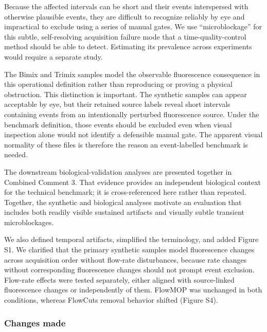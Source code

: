 \documentclass[
  11pt,
  a4paper,
]{article}
\begin{document}
Because the affected intervals can be short and their events
interspersed with otherwise plausible events, they are difficult to
recognize reliably by eye and impractical to exclude using a series of
manual gates. We use ``microblockage'' for this subtle, self-resolving
acquisition failure mode that a time-quality-control method should be
able to detect. Estimating its prevalence across experiments would
require a separate study.

The Bimix and Trimix samples model the observable fluorescence
consequence in this operational definition rather than reproducing or
proving a physical obstruction. This distinction is important. The
synthetic samples can appear acceptable by eye, but their retained
source labels reveal short intervals containing events from an
intentionally perturbed fluorescence source. Under the benchmark
definition, those events should be excluded even when visual inspection
alone would not identify a defensible manual gate. The apparent visual
normality of these files is therefore the reason an event-labelled
benchmark is needed.

The downstream biological-validation analyses are presented together in
Combined Comment 3. That evidence provides an independent biological
context for the technical benchmark; it is cross-referenced here rather
than repeated. Together, the synthetic and biological analyses motivate
an evaluation that includes both readily visible sustained artifacts and
visually subtle transient microblockages.

We also defined temporal artifacts, simplified the terminology, and
added Figure S1. We clarified that the primary synthetic samples model
fluorescence changes across acquisition order without flow-rate
disturbances, because rate changes without corresponding fluorescence
changes should not prompt event exclusion. Flow-rate effects were tested
separately, either aligned with source-linked fluorescence changes or
independently of them. FlowMOP was unchanged in both conditions, whereas
FlowCut\textquotesingle s removal behavior shifted (Figure S4).

\subsubsection{Changes made}\label{changes-made-8}
\end{document}
